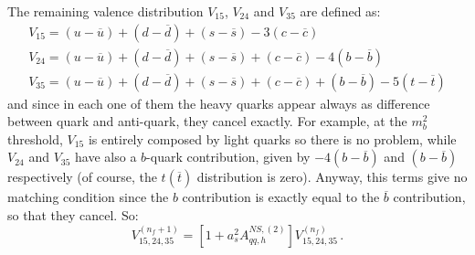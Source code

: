 \documentclass[10pt,a4paper]{article}
\begin{document}
The remaining valence distribution $V_{15}$, $V_{24}$ and $V_{35}$ are
defined as:
\begin{equation}
\begin{array}{l}
V_{15}=(u-\overline{u})+(d-\overline{d})+(s-\overline{s})-3(c-\overline{c})\\
V_{24}=(u-\overline{u})+(d-\overline{d})+(s-\overline{s})+(c-\overline{c})-4(b-\overline{b})\\
V_{35}=(u-\overline{u})+(d-\overline{d})+(s-\overline{s})+(c-\overline{c})+(b-\overline{b})-5(t-\overline{t})
\end{array}
\end{equation}
and since in each one of them the heavy quarks appear always as
difference between quark and anti-quark, they cancel exactly. For
example, at the $m_b^2$ threshold, $V_{15}$ is entirely composed by
light quarks so there is no problem, while $V_{24}$ and $V_{35}$ have
also a $b$-quark contribution, given by $-4(b-\overline{b})$ and
$(b-\overline{b})$ respectively (of course, the $t(\overline{t})$
distribution is zero). Anyway, this terms give no matching condition
since the $b$ contribution is exactly equal to the $\overline{b}$
contribution, so that they cancel. So:
\begin{equation}\label{v152435}
V_{15,24,35}^{(n_f+1)}=[1+a_s^2A_{qq,h}^{N\!S,(2)}]V^{(n_f)}_{15,24,35}\,.
\end{equation}
\end{document}
